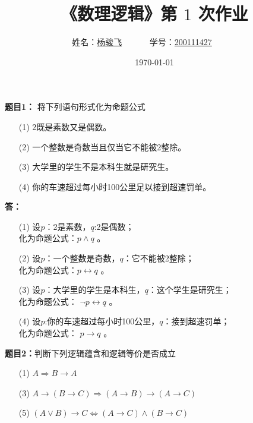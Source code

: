 \documentclass[10pt,CCT]{ctexart}
\begin{document}
%

\title{
{\heiti《数理逻辑》第 {$1$} 次作业
}
}
\date{\today}

\author{
姓名：\underline{杨骏飞}~~~~~~
学号：\underline{200111427}~~~~~~}


\maketitle

\noindent
{\bf 题目1：} 将下列语句形式化为命题公式
\begin{enumerate}
\item[(1)] 2既是素数又是偶数。
\item[(2)] 一个整数是奇数当且仅当它不能被2整除。
\item[(3)] 大学里的学生不是本科生就是研究生。
\item[(4)] 你的车速超过每小时100公里足以接到超速罚单。
\end{enumerate}

\vspace{5pt}
\noindent
{\bf 答：}
\begin{enumerate}
    \item [(1)] 设$p$：2是素数，$q$:2是偶数；\\化为命题公式：$p \wedge q$ 。
    \item [(2)] 设$p$：一个整数是奇数，$q$：它不能被2整除；\\化为命题公式：$p \leftrightarrow q$ 。
    \item [(3)] 设$p$：大学里的学生是本科生，$q$：这个学生是研究生；\\化为命题公式： $\neg p \leftrightarrow q$ 。
    \item [(4)] 设$p$:你的车速超过每小时100公里，$q$：接到超速罚单；\\化为命题公式： $p \rightarrow q$ 。
\end{enumerate}

\vspace{10pt}
\noindent
{\bf 题目2：}判断下列逻辑蕴含和逻辑等价是否成立
\begin{enumerate}
\item[(1)] $A\Rightarrow B\rightarrow A$
\item[(3)] $A \rightarrow (B \rightarrow C) \Rightarrow (A\rightarrow B) \rightarrow (A \rightarrow C)$
\item[(5)] $(A \vee B) \rightarrow C \Leftrightarrow (A \rightarrow C) \wedge (B\rightarrow C)$
\end{enumerate}
\end{document}

